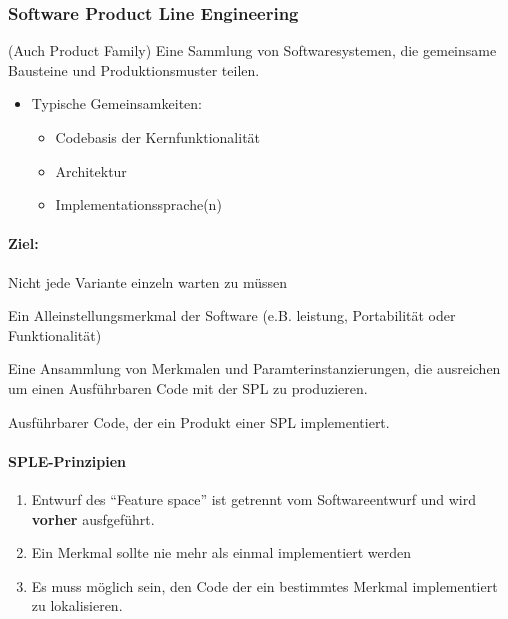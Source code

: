 \documentclass[ngerman,color=3b]{tuda_summary}
\begin{document}
\subsubsection{Software Product Line Engineering}
\begin{definition} (Auch Product Family)
    Eine Sammlung von Softwaresystemen, die gemeinsame Bausteine und Produktionsmuster teilen.
\end{definition}
\begin{itemize}
    \item Typische Gemeinsamkeiten:\begin{itemize}
              \item Codebasis der Kernfunktionalität
              \item Architektur
              \item Implementationssprache(n)
          \end{itemize}
\end{itemize}
\paragraph{Ziel:} Nicht jede Variante einzeln warten zu müssen
\clearpage
\begin{definition}
    Ein Alleinstellungsmerkmal der Software (e.B. leistung, Portabilität oder Funktionalität)
\end{definition}
\begin{definition}[Produkt]
    Eine Ansammlung von Merkmalen und Paramterinstanzierungen, die ausreichen um einen Ausführbaren Code mit der SPL zu produzieren.
\end{definition}
\begin{definition}
    Ausführbarer Code, der ein Produkt einer SPL implementiert.
\end{definition}

\paragraph{SPLE-Prinzipien}
\begin{enumerate}
    \item Entwurf des \enquote{Feature space} ist getrennt vom Softwareentwurf und wird \textbf{vorher} ausfgeführt.
    \item Ein Merkmal sollte nie mehr als einmal implementiert werden
    \item Es muss möglich sein, den Code der ein bestimmtes Merkmal implementiert zu lokalisieren.
\end{enumerate}
\end{document}
